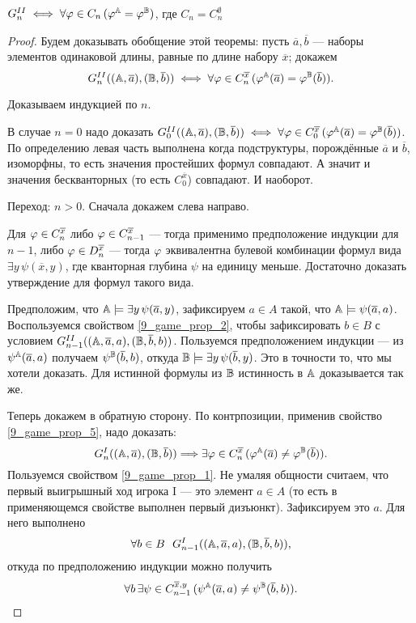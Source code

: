 \begin{theorem}
    $G_n^{II} \iff \forall \varphi\in C_n\, (\varphi^{\mathbb A} = \varphi^{\mathbb B})$, где $C_n = C_n^\emptyset$
\end{theorem}
\begin{proof}
    Будем доказывать обобщение этой теоремы: пусть $\overline{a}, \overline{b}$ — наборы элементов одинаковой длины, равные по длине набору $\overline{x}$; докажем
    $$G_n^{II}(({\mathbb A}, \overline{a}), ({\mathbb B}, \overline{b})) \iff \forall \varphi\in C_n^{\overline{x}}\, (\varphi^{\mathbb A}(\overline{a})=\varphi^{\mathbb B}(\overline{b})).$$

    Доказываем индукцией по $n$.

    В случае $n=0$ надо доказать $G_0^{II}(({\mathbb A}, \overline{a}), ({\mathbb B}, \overline{b})) \iff \forall \varphi\in C_0^{\overline{x}}\, (\varphi^{\mathbb A}(\overline{a})=\varphi^{\mathbb B}(\overline{b}))$. По определению левая часть выполнена когда подструктуры, порождённые $\overline{a}$ и $\overline{b}$, изоморфны, то есть значения простейших формул совпадают. А значит и значения бескванторных (то есть $C_0^{\overline{x}}$) совпадают. И наоборот.

    Переход: $n>0$. Сначала докажем слева направо.

    Для $\varphi\in C_n^{\overline{x}}$ либо $\varphi\in C_{n-1}^{\overline{x}}$ — тогда применимо предположение индукции для $n-1$, либо $\varphi\in D_n^{\overline{x}}$ — тогда $\varphi$ эквивалентна булевой комбинации формул вида $\exists y\, \psi(\overline{x}, y)$, где кванторная глубина $\psi$ на единицу меньше. Достаточно доказать утверждение для формул такого вида. 

    Предположим, что ${\mathbb A}\models \exists y\, \psi(\overline{a}, y)$, зафиксируем $a\in A$ такой, что ${\mathbb A}\models\psi(\overline{a}, a)$. Воспользуемся свойством \ref{9_game_prop_2}, чтобы зафиксировать $b\in B$ с условием $G_{n-1}^{II}(({\mathbb A}, \overline{a}, a), ({\mathbb B}, \overline{b}, b))$. Пользуемся предположением индукции — из $\psi^{\mathbb A}(\overline{a}, a)$ получаем $\psi^{\mathbb B}(\overline{b}, b)$, откуда ${\mathbb B}\models\exists y\, \psi(\overline{b}, y)$. Это в точности то, что мы хотели доказать. Для истинной формулы из ${\mathbb B}$ истинность в ${\mathbb A}$ доказывается так же.

    Теперь докажем в обратную сторону. По контрпозиции, применив свойство \ref{9_game_prop_5}, надо доказать:
    $$
    G_n^{I}(({\mathbb A}, \overline{a}), ({\mathbb B}, \overline{b})) \Longrightarrow \exists \varphi\in C_n^{\overline{x}}\,(\varphi^{\mathbb A}(\overline{a})\ne\varphi^{\mathbb B}(\overline{b})).
    $$
    Пользуемся свойством \ref{9_game_prop_1}. Не умаляя общности считаем, что первый выигрышный ход игрока I — это элемент $a\in A$ (то есть в применяющемся свойстве выполнен первый дизъюнкт). Зафиксируем это $a$. Для него выполнено
    $$
    \forall b\in B~~ G_{n-1}^I(({\mathbb A}, \overline{a}, a), ({\mathbb B}, \overline{b}, b)),
    $$
    откуда по предположению индукции можно получить
    $$
    \forall b\,\exists \psi\in C_{n-1}^{\overline{x}, y}\,(\psi^{\mathbb A}(\overline{a}, a)\ne\psi^{\mathbb B}(\overline{b}, b)).
    $$


\end{proof}
